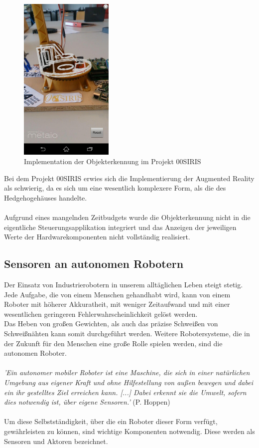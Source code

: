 \documentclass[11pt, a4paper]{article}
\begin{document}
\newpage
\begin{figure}[h!]
		\centering
		\includegraphics[width=0.4\textwidth]{graphics/augmented-reality/ar-osiris1}
		\caption{Implementation der Objekterkennung im Projekt 00SIRIS}
\end{figure}
Bei dem Projekt 00SIRIS erwies sich die Implementierung der Augmented Reality als schwierig, da es sich um eine wesentlich komplexere Form, als die des Hedgehogeh\"auses handelte. \\ \\
\noindent Aufgrund eines mangelnden Zeitbudgets wurde die Objekterkennung nicht in die eigentliche Steuerungsapplikation integriert und das Anzeigen der jeweiligen Werte der Hardwarekomponenten nicht vollst\"andig realisiert.


\newpage
\subsection{Sensoren an autonomen Robotern}
Der Einsatz von Industrierobotern in unserem allt\"aglichen Leben steigt stetig. Jede Aufgabe, die von einem Menschen gehandhabt wird, kann von einem Roboter mit h\"oherer Akkuratheit, mit weniger Zeitaufwand und mit einer wesentlichen geringeren Fehlerwahrscheinlichkeit gel\"ost werden.\\ 
Das Heben von gro\ss{}en Gewichten, als auch das pr\"azise Schwei\ss{}en von Schwei\ss{}n\"ahten kann somit durchgef\"uhrt werden. Weitere Robotersysteme, die in der Zukunft f\"ur den Menschen eine gro\ss{}e Rolle spielen werden, sind die autonomen Roboter. \\ \\
\textit{'Ein autonomer mobiler Roboter ist eine Maschine, die sich in einer nat\"urlichen Umgebung aus eigener Kraft und ohne Hilfestellung von au\ss{}en bewegen und dabei ein ihr gestelltes Ziel erreichen kann. [...] Dabei erkennt sie die Umwelt, sofern dies notwendig ist, \"uber eigene Sensoren.'} (P. Hoppen){\cite{robot-sensors}}\\ \\
Um diese Selbstst\"andigkeit, \"uber die ein Roboter dieser Form verf\"ugt, gew\"ahrleisten zu k\"onnen, sind wichtige Komponenten notwendig. Diese werden als Sensoren und Aktoren bezeichnet.
\end{document}
